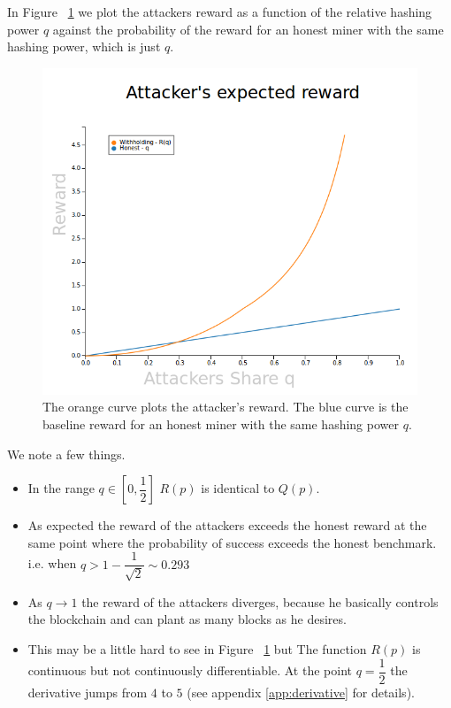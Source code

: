 \documentclass[letterpaper,12pt]{report}
\theoremstyle{plain}
\theoremstyle{definition}
\begin{document}
In Figure ~\ref{fig:AttackersReward} we plot the attackers reward as a function of the relative hashing power $q$ against the probability of the reward for an honest miner with the same hashing power, which is just $q$.

\begin{figure}[reward]
\centering
\includegraphics[width=150mm]{AttackersReward.png}
\caption{The orange curve plots the attacker's reward. The blue curve is the baseline reward for an honest miner with the same hashing power $q$.}
\label{fig:AttackersReward}
\end{figure}

We note a few things.
\begin{itemize}
\item In the range $q\in[0,\dfrac{1}{2}]$ $R(p)$ is identical to $Q(p)$.
  \item As expected the reward of the attackers exceeds the honest reward at the same point where the probability of success exceeds the honest benchmark. i.e. when $q>1-\dfrac{1}{\sqrt{2}} \sim 0.293$
  \item As $q\rightarrow 1$ the reward of the attackers diverges, because he basically controls the blockchain and can plant as many blocks as he desires.
  \item This may be a little hard to see in Figure ~\ref{fig:AttackersReward} but The function $R(p)$ is continuous but not continuously differentiable. At the point $q=\dfrac{1}{2}$ the derivative jumps from $4$ to $5$ (see appendix \ref{app:derivative} for details).
\end{itemize}
\end{document}
